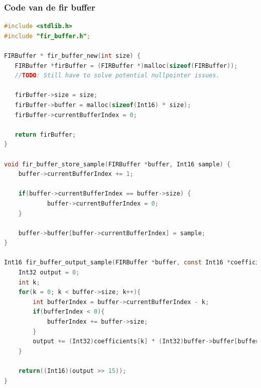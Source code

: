 \documentclass[11pt,a4paper]{article}
\begin{document}
	\subsubsection{Code van de fir buffer}
	\begin{lstlisting}[language=c]
#include <stdlib.h>
#include "fir_buffer.h";

FIRBuffer * fir_buffer_new(int size) {
   FIRBuffer *firBuffer = (FIRBuffer *)malloc(sizeof(FIRBuffer));
   //TODO: Still have to solve potential nullpointer issues.

   firBuffer->size = size;
   firBuffer->buffer = malloc(sizeof(Int16) * size);
   firBuffer->currentBufferIndex = 0;

   return firBuffer;
}

void fir_buffer_store_sample(FIRBuffer *buffer, Int16 sample) {
    buffer->currentBufferIndex += 1;

    if(buffer->currentBufferIndex == buffer->size) {
            buffer->currentBufferIndex = 0;
    }

    buffer->buffer[buffer->currentBufferIndex] = sample;
}

Int16 fir_buffer_output_sample(FIRBuffer *buffer, const Int16 *coefficients) {
    Int32 output = 0;
    int k;
    for(k = 0; k < buffer->size; k++){
        int bufferIndex = buffer->currentBufferIndex - k;
        if(bufferIndex < 0){
            bufferIndex += buffer->size;
        }
        output += (Int32)coefficients[k] * (Int32)buffer->buffer[bufferIndex];
    }

    return((Int16)(output >> 15));
}
	\end{lstlisting}
	\clearpage	
\end{document}
